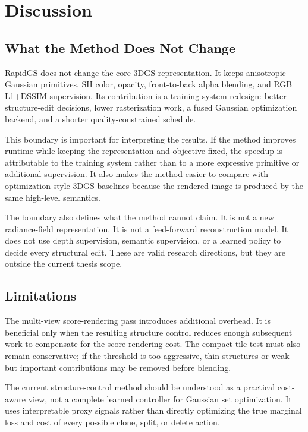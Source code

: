 \chapter{Discussion}
\label{chap:discussion}

\section{What the Method Does Not Change}

RapidGS does not change the core 3DGS representation. It keeps anisotropic Gaussian primitives, SH color, opacity, front-to-back alpha blending, and RGB L1+DSSIM supervision. Its contribution is a training-system redesign: better structure-edit decisions, lower rasterization work, a fused Gaussian optimization backend, and a shorter quality-constrained schedule.

This boundary is important for interpreting the results. If the method improves runtime while keeping the representation and objective fixed, the speedup is attributable to the training system rather than to a more expressive primitive or additional supervision. It also makes the method easier to compare with optimization-style 3DGS baselines because the rendered image is produced by the same high-level semantics.

The boundary also defines what the method cannot claim. It is not a new radiance-field representation. It is not a feed-forward reconstruction model. It does not use depth supervision, semantic supervision, or a learned policy to decide every structural edit. These are valid research directions, but they are outside the current thesis scope.

\section{Limitations}

The multi-view score-rendering pass introduces additional overhead. It is beneficial only when the resulting structure control reduces enough subsequent work to compensate for the score-rendering cost. The compact tile test must also remain conservative; if the threshold is too aggressive, thin structures or weak but important contributions may be removed before blending.

The current structure-control method should be understood as a practical cost-aware view, not a complete learned controller for Gaussian set optimization. It uses interpretable proxy signals rather than directly optimizing the true marginal loss and cost of every possible clone, split, or delete action.


